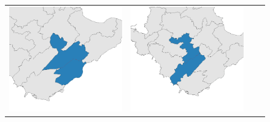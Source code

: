 \begin{figure}[p]
\begin{tabularx}{1\textwidth}{XXXX}
\includegraphics[width=1\linewidth]{images/ch6/mergefocus/15}&
\includegraphics[width=1\linewidth]{images/ch6/mergefocus/16} \\

\end{tabularx}
\end{figure}
